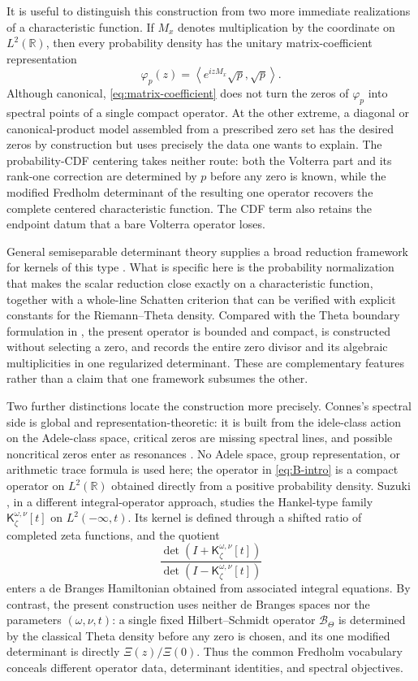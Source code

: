 \documentclass[11pt,reqno]{amsart}
\numberwithin{equation}{section}
\newcommand{\R}{\mathbb R}
\newcommand{\1}{\mathbf 1}
\newcommand{\BTheta}{\mathcal B_{\Theta}}
\begin{document}
It is useful to distinguish this construction from two more immediate
realizations of a characteristic function.  If $M_x$ denotes multiplication
by the coordinate on $L^2(\R)$, then every probability density has the unitary
matrix-coefficient representation
\begin{equation}\label{eq:matrix-coefficient}
 \varphi_p(z)=
 \left\langle e^{izM_x}\sqrt p,\sqrt p\right\rangle.
\end{equation}
Although canonical, \eqref{eq:matrix-coefficient} does not turn the zeros of
$\varphi_p$ into spectral points of a single compact operator.  At the other
extreme, a diagonal or canonical-product model assembled from a prescribed
zero set has the desired zeros by construction but uses precisely the data one
wants to explain.  The probability-CDF centering takes neither route: both the
Volterra part and its rank-one correction are determined by $p$ before any
zero is known, while the modified Fredholm determinant of the resulting one
operator recovers the complete centered characteristic function.  The CDF
term also retains the endpoint datum that a bare Volterra operator loses.

General semiseparable determinant theory supplies a broad reduction framework
for kernels of this type \cite{GesztesyMakarov2003}.  What is specific here is
the probability normalization that makes the scalar reduction close exactly
on a characteristic function, together with a whole-line Schatten criterion
that can be verified with explicit constants for the Riemann--Theta density.
Compared with the Theta boundary formulation in \cite{Hedenmalm2026}, the
present operator is bounded and compact, is constructed without selecting a
zero, and records the entire zero divisor and its algebraic multiplicities in
one regularized determinant.  These are complementary features rather than a
claim that one framework subsumes the other.

Two further distinctions locate the construction more precisely.  Connes's
spectral side is global and representation-theoretic: it is built from the
idele-class action on the Adele-class space, critical zeros are missing
spectral lines, and possible noncritical zeros enter as resonances
\cite{Connes1999}.  No Adele space, group representation, or arithmetic trace
formula is used here; the operator in \eqref{eq:B-intro} is a compact operator
on $L^2(\R)$ obtained directly from a positive probability density.  Suzuki
\cite{Suzuki2020}, in a different integral-operator approach, studies the
Hankel-type family $\mathsf K_{\zeta}^{\omega,\nu}[t]$ on
$L^2(-\infty,t)$.  Its kernel is defined through a shifted ratio of completed
zeta functions, and the quotient
\[
 \frac{\det(I+\mathsf K_{\zeta}^{\omega,\nu}[t])}
      {\det(I-\mathsf K_{\zeta}^{\omega,\nu}[t])}
\]
enters a de Branges Hamiltonian obtained from associated integral equations.
By contrast, the present construction uses neither de Branges spaces nor the
parameters $(\omega,\nu,t)$: a single fixed Hilbert--Schmidt operator
$\BTheta$ is determined by the classical Theta density before any zero is
chosen, and its one modified determinant is directly
$\Xi(z)/\Xi(0)$.  Thus the common Fredholm vocabulary conceals different
operator data, determinant identities, and spectral objectives.
\end{document}
